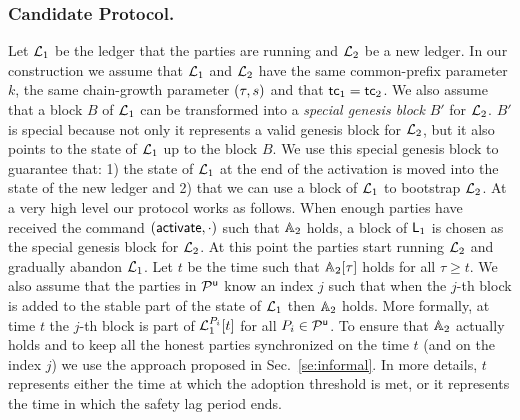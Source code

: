 \subsubsection{Candidate Protocol.}

Let $\mathcal{L}_1$ be the ledger that the parties are running and $\mathcal{L}_2$ be a new ledger.
In our construction we assume that $\mathcal{L}_1$ and $\mathcal{L}_2$ have the same common-prefix parameter $k$, the same chain-growth parameter $(\tau, s)$ and that $\mathsf{tc}_1=\mathsf{tc}_2$. We also assume that a block $B$ of $\mathcal{L}_1$ can be transformed into a \emph{special genesis block} $B'$ for $\mathcal{L}_2$. $B'$ is special because not only it represents a valid genesis block for $\mathcal{L}_2$, but it also points to the state of $\mathcal{L}_1$ up to the block $B$. 
We use this special genesis block to guarantee that: 1) the state of $\mathcal{L}_1$ at the end of the activation is moved into the state of the new ledger
and 2) that we can use a block of $\mathcal{L}_1$ to bootstrap $\mathcal{L}_2$.
At a very high level our protocol works as follows. When enough parties have received the command $(\mathsf{activate},\cdot)$ such that $\mathbb{A}_2$ holds,
a block of $\mathsf{L}_1$ is chosen as the special genesis block for $\mathcal{L}_2$. At this point the parties start running $\mathcal{L}_2$ and gradually abandon 
$\mathcal{L}_1$.
Let $t$ be the time such that  $\mathbb{A}_2[\tau]$ holds for all $\tau\geq t$.
We also assume that the parties in $\mathcal{P}^\mathsf{u}$ know an index $j$ such that when the $j$-th block is added to the stable part of the state of $\mathcal{L}_1$ then $\mathbb{A}_2$ holds. 
More formally, at time $t$ the $j$-th block is part of
$\mathcal{L}_1^{P_i}[t]$ for all $P_i\in\mathcal{P}^\mathsf{u}$.
To ensure that $\mathbb{A}_2$ actually holds and to keep all the honest parties synchronized on the time $t$ (and on the index $j$) we use the approach proposed in Sec.~\ref{se:informal}.
In more details, $t$ represents either the time at which the adoption threshold is met, or it represents the time in which the safety lag period ends.

